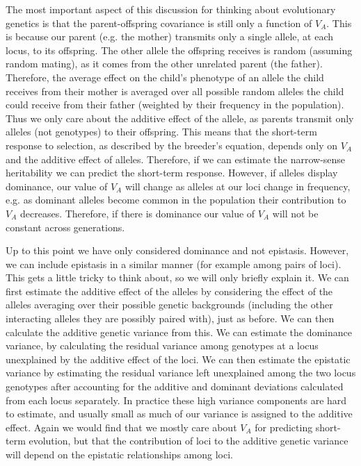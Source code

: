 The most important aspect of this discussion for thinking about
evolutionary genetics is that the parent-offspring covariance is still
only a function of $V_A$. This is because our parent (e.g. the mother) transmits only a
single allele, at each locus, to its offspring. The other allele the
offspring receives is random (assuming random mating), as it comes
from the other unrelated parent (the father). Therefore, the average
effect on the child's phenotype of
an allele the child receives from their mother is averaged over
all possible random alleles the child could receive from their father (weighted by their frequency in the population). Thus we only
care about the additive effect of the allele, as parents transmit only
alleles (not genotypes) to their offspring. This means that the short-term response
to selection, as described by the breeder's equation, depends only on
$V_A$ and the additive effect of alleles. Therefore, if we can
estimate the narrow-sense heritability we can predict the short-term response.
However, if alleles display dominance, our value of $V_A$ will change as alleles at our loci change in frequency, e.g. as dominant alleles become common
in the population their contribution to $V_A$ decreases. Therefore,
if there is dominance our value of $V_A$ will not be constant across generations.

Up to this point we have only considered dominance and not epistasis. However, we can include epistasis in a similar manner (for example among pairs of loci). This gets a little
tricky to think about, so we will only briefly explain it. 
 We can first estimate the additive effect of the
alleles by considering the effect of the alleles averaging over their possible genetic backgrounds (including the other interacting alleles they are possibly paired with), just as before. We can then
calculate the additive genetic variance from this. We can estimate
the dominance variance, by calculating the residual variance among
genotypes at a locus unexplained by the additive effect of the
loci. We can then estimate the epistatic variance by estimating the
residual variance left unexplained among the two locus genotypes after accounting for the additive and dominant deviations calculated from each locus separately. In practice these
high variance components are hard to estimate, and usually small as
much of our variance is assigned to the additive effect. Again we
would find that we mostly care about $V_A$ for predicting short-term
evolution, but that the contribution of loci to the additive genetic
variance will depend on the epistatic relationships among loci.



